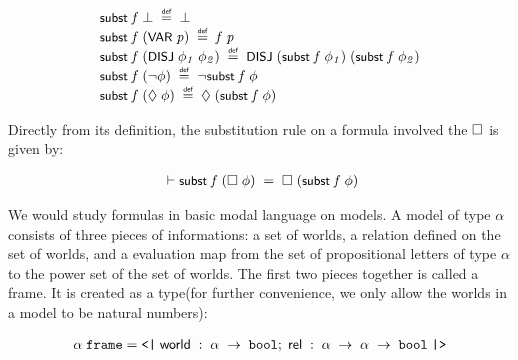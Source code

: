 \documentclass[letterpaper]{article}
\renewcommand{\HOLConst}[1]{{\textsf{\upshape\small #1}}}
\renewcommand{\HOLinline}[1]{\ensuremath{#1}}
\newenvironment{holmath}{\begin{displaymath}\begin{array}{l}}{\end{array}\end{displaymath}\ignorespacesafterend}
\begin{document}
\begin{holmath}
\HOLConst{subst}\;\HOLFreeVar{f}\;\HOLSymConst{\ensuremath{\bot}}\;\HOLSymConst{\HOLTokenDefEquality{}}\;\HOLSymConst{\ensuremath{\bot}}\\
\HOLConst{subst}\;\HOLFreeVar{f}\;(\HOLConst{VAR}\;\HOLFreeVar{p})\;\HOLSymConst{\HOLTokenDefEquality{}}\;\HOLFreeVar{f}\;\HOLFreeVar{p}\\
\HOLConst{subst}\;\HOLFreeVar{f}\;(\HOLConst{DISJ}\;\HOLFreeVar{\ensuremath{\phi\sb{1}}}\;\HOLFreeVar{\ensuremath{\phi\sb{2}}})\;\HOLSymConst{\HOLTokenDefEquality{}}\;\HOLConst{DISJ}\;(\HOLConst{subst}\;\HOLFreeVar{f}\;\HOLFreeVar{\ensuremath{\phi\sb{1}}})\;(\HOLConst{subst}\;\HOLFreeVar{f}\;\HOLFreeVar{\ensuremath{\phi\sb{2}}})\\
\HOLConst{subst}\;\HOLFreeVar{f}\;(\HOLSymConst{\HOLTokenNeg{}}\HOLFreeVar{\ensuremath{\phi}})\;\HOLSymConst{\HOLTokenDefEquality{}}\;\HOLSymConst{\HOLTokenNeg{}}\HOLConst{subst}\;\HOLFreeVar{f}\;\HOLFreeVar{\ensuremath{\phi}}\\
\HOLConst{subst}\;\HOLFreeVar{f}\;(\HOLSymConst{\ensuremath{\Diamond}}\;\HOLFreeVar{\ensuremath{\phi}})\;\HOLSymConst{\HOLTokenDefEquality{}}\;\HOLSymConst{\ensuremath{\Diamond}}\;(\HOLConst{subst}\;\HOLFreeVar{f}\;\HOLFreeVar{\ensuremath{\phi}})
\end{holmath}

Directly from its definition, the substitution rule on a formula involved the \HOLinline{\HOLSymConst{\ensuremath{\Box}}} is given by:

\begin{holmath}
  \ensuremath{\HOLTokenTurnstile}\HOLConst{subst}\;\HOLFreeVar{f}\;(\HOLSymConst{\ensuremath{\Box}}\;\HOLFreeVar{\ensuremath{\phi}})\;\HOLSymConst{=}\;\HOLSymConst{\ensuremath{\Box}}\;(\HOLConst{subst}\;\HOLFreeVar{f}\;\HOLFreeVar{\ensuremath{\phi}})
\end{holmath}

We would study formulas in basic modal language on models. A model of type $\alpha$ consists of three pieces of informations: a set of worlds, a relation defined on the set of worlds, and a evaluation map from the set of propositional letters of type $\alpha$ to the power set of the set of worlds. The first two pieces together is called a frame. It is created as a type(for further convenience, we only allow the worlds in a model to be natural numbers):

\begin{holmath}
  \ensuremath{\alpha}\;\HOLTyOp{frame} = \HOLTokenLeftrec{}\;\HOLFieldName{world}\;:\;\ensuremath{\alpha}\;\ensuremath{\rightarrow}\;\HOLTyOp{bool};\;\HOLFieldName{rel}\;:\;\ensuremath{\alpha}\;\ensuremath{\rightarrow}\;\ensuremath{\alpha}\;\ensuremath{\rightarrow}\;\HOLTyOp{bool}\;\HOLTokenRightrec{}
\end{holmath}
\end{document}
